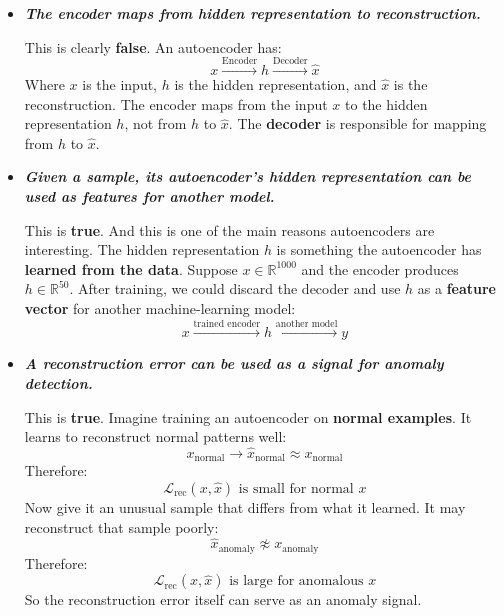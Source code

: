 \begin{itemize}
    \item[\textcolor{Red2}{\textbf{F.}}] \textcolor{Red2}{\textbf{\emph{The encoder maps from hidden representation to reconstruction.}}}

        This is clearly \textbf{false}. An autoencoder has:
        \begin{equation*}
            x \xrightarrow{\text{Encoder}} h \xrightarrow{\text{Decoder}} \hat{x}
        \end{equation*}
        Where $x$ is the input, $h$ is the hidden representation, and $\hat{x}$ is the reconstruction. The encoder maps from the input $x$ to the hidden representation $h$, not from $h$ to $\hat{x}$. The \textbf{decoder} is responsible for mapping from $h$ to $\hat{x}$.

    \item[\textcolor{Green3}{\textbf{T.}}] \textcolor{Green3}{\textbf{\emph{Given a sample, its autoencoder's hidden representation can be used as features for another model.}}}

        This is \textbf{true}. And this is one of the main reasons autoencoders are interesting. The hidden representation $h$ is something the autoencoder has \textbf{learned from the data}. Suppose $x \in \mathbb{R}^{1000}$ and the encoder produces $h \in \mathbb{R}^{50}$. After training, we could discard the decoder and use $h$ as a \textbf{feature vector} for another machine-learning model:
        \begin{equation*}
            x \xrightarrow{\text{trained encoder}} h \xrightarrow{\text{another model}} y
        \end{equation*}

    \item[\textcolor{Green3}{\textbf{T.}}] \textcolor{Green3}{\textbf{\emph{A reconstruction error can be used as a signal for anomaly detection.}}}

        This is \textbf{true}. Imagine training an autoencoder on \textbf{normal examples}. It learns to reconstruct normal patterns well:
        \begin{equation*}
            x_{\text{normal}} \to \hat{x}_{\text{normal}} \approx x_{\text{normal}}
        \end{equation*}
        Therefore:
        \begin{equation*}
            \mathcal{L}_{\text{rec}}\left(x, \hat{x}\right) \text{ is small for normal } x
        \end{equation*}
        Now give it an unusual sample that differs from what it learned. It may reconstruct that sample poorly:
        \begin{equation*}
            \hat{x}_{\text{anomaly}} \not\approx x_{\text{anomaly}}
        \end{equation*}
        Therefore:
        \begin{equation*}
            \mathcal{L}_{\text{rec}}\left(x, \hat{x}\right) \text{ is large for anomalous } x
        \end{equation*}
        So the reconstruction error itself can serve as an anomaly signal.


\end{itemize}
